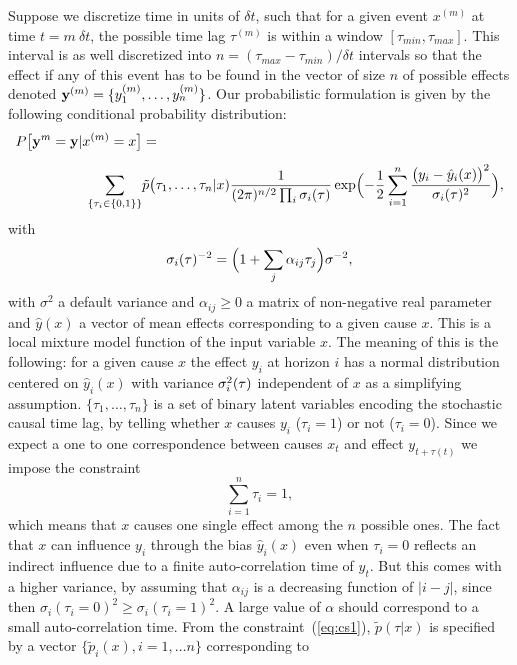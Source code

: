 \documentclass[envcountsect,runningheads]{llncs}
\theoremstyle{etoile}
\begin{document}
Suppose we discretize time in units of $\delta t$, such that for a given event $x^{(m)}$ at time  $t = m\ \delta t$, the possible time lag $\tau^{(m)}$ is within a window
$[\tau_{min},\tau_{max}]$. This interval is as well discretized into $n = (\tau_{max}-\tau_{min})/\delta t $ intervals so that the effect if any of this event has to be found in the vector of size $n$ of
possible effects denoted ${\bf y}^{(m)} = \{y_1^{(m)},\ldots,y_n^{(m)}\}$.
Our probabilistic formulation is given by the following conditional probability distribution:
\begin{align}
  P\bigl[{\bf y}^{m} = {\bf y}\vert x^{(m)}=x\bigr] &= \nonumber\\[0.2cm]
  \sum_{\{\tau_i\in\{0,1\}\}} & \tilde p\bigl(\tau_1,\ldots,\tau_n\vert x)
\frac{1}{(2\pi)^{n/2}\prod_i\sigma_i({\bf \tau})}
\exp\Bigl(-\frac{1}{2}\sum_{i=1}^n\frac{\bigl(y_i-\hat y_i(x)\bigr)^2}{\sigma_i({\bf \tau})^2}\Bigr),\label{eq:py}
\end{align}
with 
\[
\sigma_i({\bf \tau})^{-2} = \Bigl(1+\sum_j\alpha_{ij} \tau_j\Bigr)\sigma^{-2},
\]
with $\sigma^2$ a default variance and $\alpha_{ij}\ge 0$ a matrix of non-negative real parameter and $\hat y(x)$ a vector of mean effects corresponding to a given cause $x$. 
This is a local mixture model function of the input variable $x$.
The meaning of this is the following: for a given cause $x$ the effect
$y_i$ at horizon $i$ has a normal distribution centered on $\hat y_i(x)$ with  variance $\sigma_i^2({\bf \tau})$ independent of $x$ as a simplifying assumption. $\{\tau_1,\ldots,\tau_n\}$ is a set of binary
latent variables encoding the stochastic causal time lag, by telling whether $x$ causes $y_i$ ($\tau_i=1$) or not ($\tau_i=0$). Since we expect a one to one correspondence between causes
$x_t$ and effect $y_{t+\tau(t)}$ we impose the constraint
\begin{equation}\label{eq:cs1}
\sum_{i=1}^n \tau_i = 1,
\end{equation}
which means that $x$ causes one single effect among the $n$ possible ones. The fact that $x$ can influence $y_i$ through the bias $\hat y_i(x)$ even when $\tau_i=0$ reflects an indirect
influence due to a finite auto-correlation time of $y_t$. But this comes with a higher variance, by assuming that $\alpha_{ij}$ is a decreasing function of $\vert i-j\vert$, 
since then $\sigma_i(\tau_i=0)^2\ge \sigma_i(\tau_i=1)^2$.
A large value of $\alpha$ should correspond to a small auto-correlation time. From the constraint~(\ref{eq:cs1}), $\tilde p(\tau\vert x)$ is specified by  a vector
$\{\tilde p_i(x),i=1,\dots n\}$ corresponding to
\end{document}
